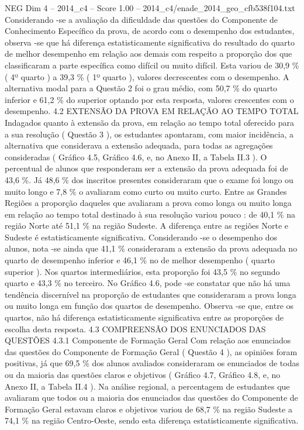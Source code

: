 \begin{textsample}{NEG Dim 4 – 2014\_c4 – Score 1.00 – 2014\_c4/enade\_2014\_geo\_cfb538f104.txt}
Considerando -se a avaliação da dificuldade das questões do Componente de Conhecimento Específico da prova, de acordo com o desempenho dos estudantes, observa -se que há diferença estatisticamente significativa do resultado do quarto de melhor desempenho em relação aos demais com respeito a proporção dos que classificaram a parte específica como difícil ou muito difícil.
Esta variou de 30,9 \% ( 4º quarto ) a 39,3 \% ( 1º quarto ), valores decrescentes com o desempenho.
A alternativa modal para a Questão 2 foi o grau médio, com 50,7 \% do quarto inferior e 61,2 \% do superior optando por esta resposta, valores crescentes com o desempenho. 4.2 EXTENSÃO DA PROVA EM RELAÇÃO AO TEMPO TOTAL Indagados quanto à extensão da prova, em relação ao tempo total oferecido para a sua resolução ( Questão 3 ), os estudantes apontaram, com maior incidência, a alternativa que considerava a extensão adequada, para todas as agregações consideradas ( Gráfico 4.5, Gráfico 4.6, e, no Anexo II, a Tabela II.3 ).
O percentual de alunos que responderam ser a extensão da prova adequada foi de 43,6 \%.
Já 48,6 \% dos inscritos presentes consideraram que o exame foi longo ou muito longo e 7,8 \% o avaliaram como curto ou muito curto.
Entre as Grandes Regiões a proporção daqueles que avaliaram a prova como longa ou muito longa em relação ao tempo total destinado à sua resolução variou pouco : de 40,1 \% na região Norte até 51,1 \% na região Sudeste.
A diferença entre as regiões Norte e Sudeste é estatisticamente significativa.
Considerando -se o desempenho dos alunos, nota -se ainda que 41,1 \% consideraram a extensão da prova adequada no quarto de desempenho inferior e 46,1 \% no de melhor desempenho ( quarto superior ).
Nos quartos intermediários, esta proporção foi 43,5 \% no segundo quarto e 43,3 \% no terceiro.
No Gráfico 4.6, pode -se constatar que não há uma tendência discernível na proporção de estudantes que consideraram a prova longa ou muito longa em função dos quartos de desempenho.
Observa -se que, entre os quartos, não há diferença estatisticamente significativa entre as proporções de escolha desta resposta. 4.3 COMPREENSÃO DOS ENUNCIADOS DAS QUESTÕES 4.3.1 Componente de Formação Geral Com relação aos enunciados das questões do Componente de Formação Geral ( Questão 4 ), as opiniões foram positivas, já que 69,5 \% dos alunos avaliados consideraram os enunciados de todas ou da maioria das questões claros e objetivos ( Gráfico 4.7, Gráfico 4.8, e, no Anexo II, a Tabela II.4 ).
Na análise regional, a percentagem de estudantes que avaliaram que todos ou a maioria dos enunciados das questões do Componente de Formação Geral estavam claros e objetivos variou de 68,7 \% na região Sudeste a 74,1 \% na região Centro-Oeste, sendo esta diferença estatisticamente significativa.

\end{textsample}
